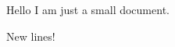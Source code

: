 \documentclass{article}
\begin{document}
Hello I am just a small document. 

New lines!
\end{document}
